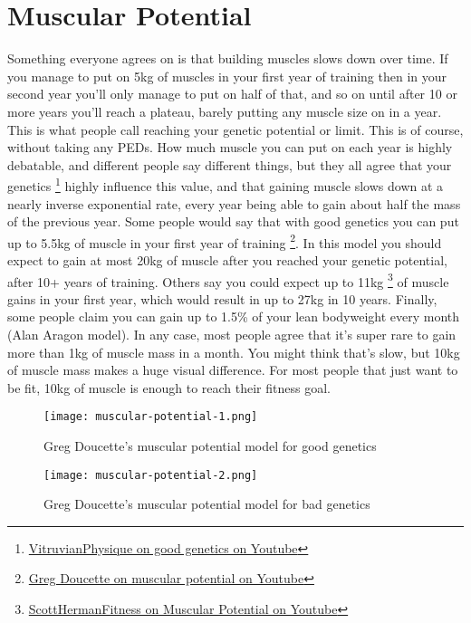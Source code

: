 \documentclass[openany, 12pt]{book}
\begin{document}
        \section{Muscular Potential}

        Something everyone agrees on is that building muscles slows down over time. If you manage to put on 5kg of muscles in your first year of training then in your second year you'll only
        manage to put on half of that, and so on until after 10 or more years you'll reach a plateau, barely putting any muscle size on in a year. This is what people call reaching your genetic
        potential or limit. This is of course, without taking any PEDs. How much muscle you can put on each year is highly debatable, and different people say different things, but they all
        agree that your genetics
        \footnote{\href{https://www.youtube.com/watch?v=KC4Sc_XgmZ0}{VitruvianPhysique on good genetics on Youtube}}
        highly influence this value, and that gaining muscle slows down at a nearly inverse exponential rate, every year being able to gain about half the mass of the previous year.
        Some people would say that with good genetics you can put up to 5.5kg of muscle in your first year of training
        \footnote{\href{https://www.youtube.com/watch?v=r4Hyli_4frY}{Greg Doucette on muscular potential on Youtube}}. In this model you should expect to gain at most 20kg of muscle after you reached
        your genetic potential, after 10+ years of training. Others say you could expect up to 11kg
        \footnote{\href{https://www.youtube.com/watch?v=vQ2vxH4eOGw}{ScottHermanFitness on Muscular Potential on Youtube}} of muscle gains in your first year, which would result in up to 27kg in 10 years.
        Finally, some people claim you can gain up to 1.5\% of your lean bodyweight every month (Alan Aragon model). In any case, most people agree that it's super rare to gain more than 1kg of muscle mass
        in a month. You might think that's slow, but 10kg of muscle mass makes a huge visual difference. For most people that just want to be fit, 10kg of muscle is enough to reach their fitness goal.

        \begin{figure}[h]
		\centering
		\texttt{[image: muscular-potential-1.png]}
		\caption{Greg Doucette’s muscular potential model for good genetics}
		\label{fig15}
	\end{figure}

        \begin{figure}[h]
		\centering
		\texttt{[image: muscular-potential-2.png]}
		\caption{Greg Doucette’s muscular potential model for bad genetics}
		\label{fig16}
	\end{figure}
\end{document}
